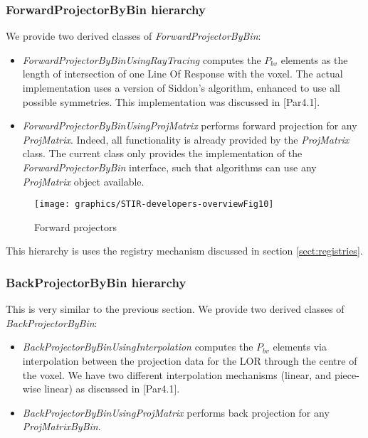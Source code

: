 \documentclass{article}
\begin{document}
\subsubsection{
ForwardProjectorByBin hierarchy}

We provide two derived classes of \textit{ForwardProjectorByBin}: 
\begin{itemize}
\item 
\textit{ForwardProjectorByBinUsingRayTracing} computes the $P_{bv}$ 
elements as the length of intersection of one Line Of Response 
with the voxel. The actual implementation uses a version of Siddon's 
algorithm, enhanced to use all possible symmetries. This implementation 
was discussed in [Par4.1].
\item 
\textit{ForwardProjectorByBinUsingProjMatrix} performs forward projection 
for any \textit{ProjMatrix}. Indeed, all functionality is already 
provided by the \textit{ProjMatrix} class. The current class only 
provides the implementation of the \textit{ForwardProjectorByBin} 
interface, such that algorithms can use any \textit{ProjMatrix} object 
available.
\end{itemize}

\begin{figure}[htbp]
\begin{center}
\texttt{[image: graphics/STIR-developers-overviewFig10]}
\caption{Forward projectors}
\end{center}
\end{figure}
This hierarchy is uses the registry mechanism discussed in section 
\ref{sect:registries}.

\subsubsection{
BackProjectorByBin hierarchy}

This is very similar to the previous section. We provide two 
derived classes of \textit{BackProjectorByBin}: 
\begin{itemize}
\item 
\textit{BackProjectorByBinUsingInterpolation} computes the $P_{bv}$ 
elements via interpolation between the projection data for the 
LOR through the centre of the voxel. We have two different interpolation 
mechanisms (linear, and piece-wise linear) as discussed in [Par4.1].
\item 
\textit{BackProjectorByBinUsingProjMatrix} performs back projection 
for any \textit{ProjMatrixByBin}. 
\end{itemize}
\end{document}
